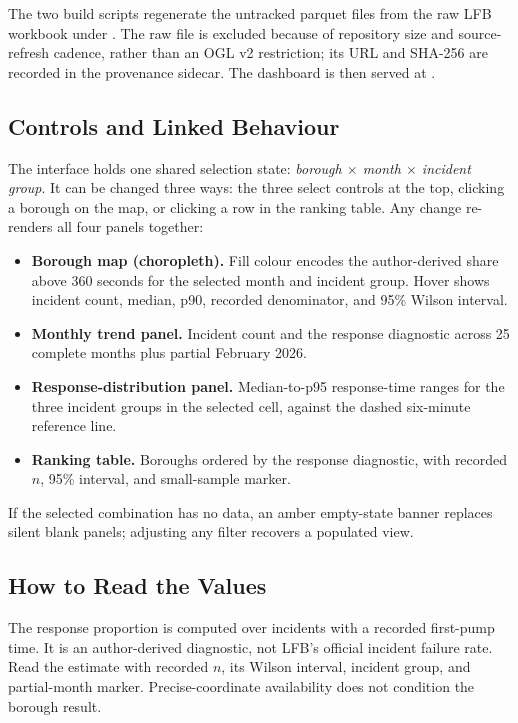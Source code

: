 The two build scripts regenerate the untracked parquet files from the raw LFB workbook under . The raw file is excluded because of repository size and source-refresh cadence, rather than an OGL v2 restriction; its URL and SHA-256 are recorded in the provenance sidecar. The dashboard is then served at .

\subsection{Controls and Linked Behaviour}

The interface holds one shared selection state: \emph{borough $\times$ month $\times$ incident group}. It can be changed three ways: the three select controls at the top, clicking a borough on the map, or clicking a row in the ranking table. Any change re-renders all four panels together:

\begin{itemize}
    \item \textbf{Borough map (choropleth).} Fill colour encodes the author-derived share above 360 seconds for the selected month and incident group. Hover shows incident count, median, p90, recorded denominator, and 95\% Wilson interval.
    \item \textbf{Monthly trend panel.} Incident count and the response diagnostic across 25 complete months plus partial February 2026.
    \item \textbf{Response-distribution panel.} Median-to-p95 response-time ranges for the three incident groups in the selected cell, against the dashed six-minute reference line.
    \item \textbf{Ranking table.} Boroughs ordered by the response diagnostic, with recorded $n$, 95\% interval, and small-sample marker.
\end{itemize}

If the selected combination has no data, an amber empty-state banner replaces silent blank panels; adjusting any filter recovers a populated view.

\subsection{How to Read the Values}

The response proportion is computed over incidents with a recorded first-pump time. It is an author-derived diagnostic, not LFB's official incident failure rate. Read the estimate with recorded $n$, its Wilson interval, incident group, and partial-month marker. Precise-coordinate availability does not condition the borough result.

